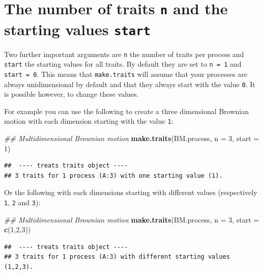 \documentclass[
]{book}
\newenvironment{Shaded}{\begin{snugshade}}{\end{snugshade}}
\newcommand{\CommentTok}[1]{\textcolor[rgb]{0.56,0.35,0.01}{\textit{#1}}}
\newcommand{\DataTypeTok}[1]{\textcolor[rgb]{0.13,0.29,0.53}{#1}}
\newcommand{\DecValTok}[1]{\textcolor[rgb]{0.00,0.00,0.81}{#1}}
\newcommand{\KeywordTok}[1]{\textcolor[rgb]{0.13,0.29,0.53}{\textbf{#1}}}
\newcommand{\NormalTok}[1]{#1}
\begin{document}
\hypertarget{the-number-of-traits-n-and-the-starting-values-start}{%
\section{\texorpdfstring{The number of traits \texttt{n} and the starting values \texttt{start}}{The number of traits n and the starting values start}}\label{the-number-of-traits-n-and-the-starting-values-start}}

Two further important arguments are \texttt{n} the number of traits per process and \texttt{start} the starting values for all traits.
By default they are set to \texttt{n\ =\ 1} and \texttt{start\ =\ 0}.
This means that \texttt{make.traits} will assume that your processes are always unidimensional by default and that they always start with the value \texttt{0}.
It is possible however, to change these values.

For example you can use the following to create a three dimensional Brownian motion with each dimension starting with the value \texttt{1}:

\begin{Shaded}
\begin{Highlighting}[]
\CommentTok{\#\# Multidimensional Brownian motion}
\KeywordTok{make.traits}\NormalTok{(BM.process, }\DataTypeTok{n =} \DecValTok{3}\NormalTok{, }\DataTypeTok{start =} \DecValTok{1}\NormalTok{)}
\end{Highlighting}
\end{Shaded}

\begin{verbatim}
##  ---- treats traits object ---- 
## 3 traits for 1 process (A:3) with one starting value (1).
\end{verbatim}

Or the following with each dimensions starting with different values (respectively \texttt{1}, \texttt{2} and \texttt{3}):

\begin{Shaded}
\begin{Highlighting}[]
\CommentTok{\#\# Multidimensional Brownian motion}
\KeywordTok{make.traits}\NormalTok{(BM.process, }\DataTypeTok{n =} \DecValTok{3}\NormalTok{, }\DataTypeTok{start =} \KeywordTok{c}\NormalTok{(}\DecValTok{1}\NormalTok{,}\DecValTok{2}\NormalTok{,}\DecValTok{3}\NormalTok{))}
\end{Highlighting}
\end{Shaded}

\begin{verbatim}
##  ---- treats traits object ---- 
## 3 traits for 1 process (A:3) with different starting values (1,2,3).
\end{verbatim}
\end{document}
